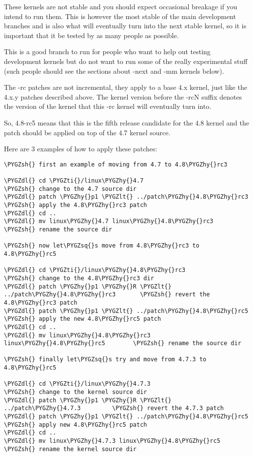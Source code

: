 \documentclass[a4paper,8pt,english]{sphinxmanual}
\def\PYGZlt{\char`\<}
\def\PYGZsh{\char`\#}
\def\PYGZdl{\char`\$}
\def\PYGZhy{\char`\-}
\def\PYGZsq{\char`\'}
\def\PYGZti{\char`\~}
\renewcommand\PYGZsq{\textquotesingle}
\begin{document}
These kernels are not stable and you should expect occasional breakage if
you intend to run them. This is however the most stable of the main
development branches and is also what will eventually turn into the next
stable kernel, so it is important that it be tested by as many people as
possible.

This is a good branch to run for people who want to help out testing
development kernels but do not want to run some of the really experimental
stuff (such people should see the sections about -next and -mm kernels below).

The -rc patches are not incremental, they apply to a base 4.x kernel, just
like the 4.x.y patches described above. The kernel version before the -rcN
suffix denotes the version of the kernel that this -rc kernel will eventually
turn into.

So, 4.8-rc5 means that this is the fifth release candidate for the 4.8
kernel and the patch should be applied on top of the 4.7 kernel source.

Here are 3 examples of how to apply these patches:

\begin{Verbatim}[commandchars=\\\{\}]
\PYGZsh{} first an example of moving from 4.7 to 4.8\PYGZhy{}rc3

\PYGZdl{} cd \PYGZti{}/linux\PYGZhy{}4.7                        \PYGZsh{} change to the 4.7 source dir
\PYGZdl{} patch \PYGZhy{}p1 \PYGZlt{} ../patch\PYGZhy{}4.8\PYGZhy{}rc3          \PYGZsh{} apply the 4.8\PYGZhy{}rc3 patch
\PYGZdl{} cd ..
\PYGZdl{} mv linux\PYGZhy{}4.7 linux\PYGZhy{}4.8\PYGZhy{}rc3            \PYGZsh{} rename the source dir

\PYGZsh{} now let\PYGZsq{}s move from 4.8\PYGZhy{}rc3 to 4.8\PYGZhy{}rc5

\PYGZdl{} cd \PYGZti{}/linux\PYGZhy{}4.8\PYGZhy{}rc3                    \PYGZsh{} change to the 4.8\PYGZhy{}rc3 dir
\PYGZdl{} patch \PYGZhy{}p1 \PYGZhy{}R \PYGZlt{} ../patch\PYGZhy{}4.8\PYGZhy{}rc3       \PYGZsh{} revert the 4.8\PYGZhy{}rc3 patch
\PYGZdl{} patch \PYGZhy{}p1 \PYGZlt{} ../patch\PYGZhy{}4.8\PYGZhy{}rc5          \PYGZsh{} apply the new 4.8\PYGZhy{}rc5 patch
\PYGZdl{} cd ..
\PYGZdl{} mv linux\PYGZhy{}4.8\PYGZhy{}rc3 linux\PYGZhy{}4.8\PYGZhy{}rc5        \PYGZsh{} rename the source dir

\PYGZsh{} finally let\PYGZsq{}s try and move from 4.7.3 to 4.8\PYGZhy{}rc5

\PYGZdl{} cd \PYGZti{}/linux\PYGZhy{}4.7.3                      \PYGZsh{} change to the kernel source dir
\PYGZdl{} patch \PYGZhy{}p1 \PYGZhy{}R \PYGZlt{} ../patch\PYGZhy{}4.7.3         \PYGZsh{} revert the 4.7.3 patch
\PYGZdl{} patch \PYGZhy{}p1 \PYGZlt{} ../patch\PYGZhy{}4.8\PYGZhy{}rc5          \PYGZsh{} apply new 4.8\PYGZhy{}rc5 patch
\PYGZdl{} cd ..
\PYGZdl{} mv linux\PYGZhy{}4.7.3 linux\PYGZhy{}4.8\PYGZhy{}rc5          \PYGZsh{} rename the kernel source dir
\end{Verbatim}
\end{document}
